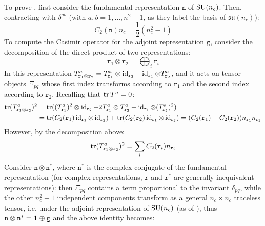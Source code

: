 To prove , first consider the fundamental representation $ \mathtt{n} $ of $ \mathrm{SU}(n_c) $.
Then, contracting  with $ \delta^{ab} $ (with $ a,b = 1,\dots, n^2 - 1 $, as they label the basis of $ \mathfrak{su}(n_c) $):
\begin{equation*}
  C_2(\mathtt{n}) n_c = \frac{1}{2} (n_c^2 - 1)
\end{equation*}
To compute the Casimir operator for the adjoint representation $ \mathtt{g} $, consider the decomposition of the direct product of two representations:
\begin{equation*}
  \mathtt{r}_1 \otimes \mathtt{r}_2 = \bigoplus_i \mathtt{r}_i
\end{equation*}
In this representation $ T^a_{\mathtt{r}_1 \otimes \mathtt{r}_2} = T^a_{\mathtt{r}_1} \otimes \operatorname{id}_{\mathtt{r}_2} + \operatorname{id}_{\mathtt{r}_1} \otimes T^a_{\mathtt{r}_2} $, and it acts on tensor objects $ \Xi_{pq} $ whose first index transforms according to $ \mathtt{r}_1 $ and the second index according to $ \mathtt{r}_2 $. Recalling that $ \operatorname{tr}{T^a} = 0 $:
\begin{equation*}
  \begin{split}
    \operatorname{tr} (T^a_{\mathtt{r}_1 \otimes \mathtt{r}_2})^2
    &= \operatorname{tr} ((T^a_{\mathtt{r}_1})^2 \otimes \operatorname{id}_{\mathtt{r}_2} + 2 T^a_{\mathtt{r}_1} \otimes T^a_{\mathtt{r}_2} + \operatorname{id}_{\mathtt{r}_1} \otimes (T^a_{\mathtt{r}_2})^2) \\
    &= \operatorname{tr} (C_2(\mathtt{r}_1) \operatorname{id}_{\mathtt{r}_1} \otimes \operatorname{id}_{\mathtt{r}_2}) + \operatorname{tr} (C_2(\mathtt{r}_2) \operatorname{id}_{\mathtt{r}_1} \otimes \operatorname{id}_{\mathtt{r}_2}) = (C_2(\mathtt{r}_1) + C_2(\mathtt{r}_2)) n_{\mathtt{r}_1} n_{\mathtt{r}_2}
  \end{split}
\end{equation*}
However, by the decomposition above:
\begin{equation*}
  \operatorname{tr} (T^a_{\mathtt{r}_1 \otimes \mathtt{r}_2})^2 = \sum_i C_2(\mathtt{r}_i) n_{\mathtt{r}_i}
\end{equation*}
Consider $ \mathtt{n} \otimes \mathtt{n}^* $, where $ \mathtt{n}^* $ is the complex conjugate of the fundamental representation (for complex representations, $ \mathtt{r} $ and $ \mathtt{r}^* $ are generally inequivalent representations): then $ \Xi_{pq} $ contains a term proportional to the invariant $ \delta_{pq} $, while the other $ n_c^2 - 1 $  independent components transform as a general $ n_c \times n_c $ traceless tensor, i.e. under the adjoint representation of $ \mathrm{SU}(n_c) $ (as of ), thus $ \mathtt{n} \otimes \mathtt{n}^* = \mathbf{1} \oplus \mathtt{g} $ and the above identity becomes:
